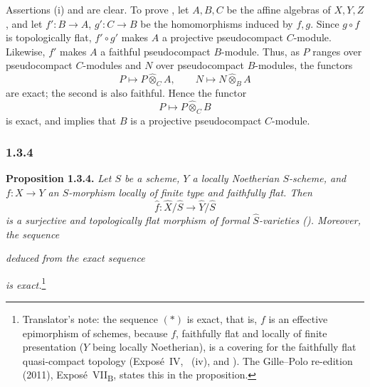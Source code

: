 Assertions \textup{(i)} and \textup{} are clear. To prove
\textup{}, let \(A,B,C\) be the affine algebras of \(X,Y,Z\), and
let \(f':B\to A\), \(g':C\to B\) be the homomorphisms induced by
\(f,g\). Since \(g\circ f\) is topologically flat,
\(f'\circ g'\) makes \(A\) a projective pseudocompact \(C\)-module.
Likewise, \(f'\) makes \(A\) a faithful pseudocompact
\(B\)-module. Thus, as \(P\) ranges over pseudocompact \(C\)-modules
and \(N\) over pseudocompact \(B\)-modules, the functors
\[
  P\longmapsto P\widehat{\otimes}_C A,
  \qquad
  N\longmapsto N\widehat{\otimes}_B A
\]
are exact; the second is also faithful. Hence the functor
\[
  P\longmapsto P\widehat{\otimes}_C B
\]
is exact, and  implies that \(B\) is a projective
pseudocompact \(C\)-module.

\subsubsection*{1.3.4}
\label{sga3:VIIB:1.3.4}

\noindent\textbf{Proposition 1.3.4.}
{\itshape Let \(S\) be a scheme, \(Y\) a locally Noetherian
\(S\)-scheme, and \(f:X\to Y\) an \(S\)-morphism locally of finite type
and faithfully flat. Then
\[
  \widehat f:
  \widehat X/\widehat S
  \longrightarrow
  \widehat Y/\widehat S
\]
is a surjective and topologically flat morphism of formal
\(\widehat S\)-varieties \textup{()}. Moreover, the sequence}

\begin{center}
  
\end{center}

{\itshape deduced from the exact sequence}

\begin{center}
  
\end{center}

{\itshape is exact.}\footnote{Translator's note: the sequence \((\ast)\) is exact, that is, \(f\) is an
effective epimorphism of schemes, because \(f\), faithfully flat and locally of finite presentation (\(Y\)
being locally Noetherian), is a covering for the faithfully flat quasi-compact topology (Expos\'e~IV,
~(iv), and ). The Gille--Polo re-edition (2011),
Expos\'e~VII\textsubscript{B}, states this in the proposition.}

